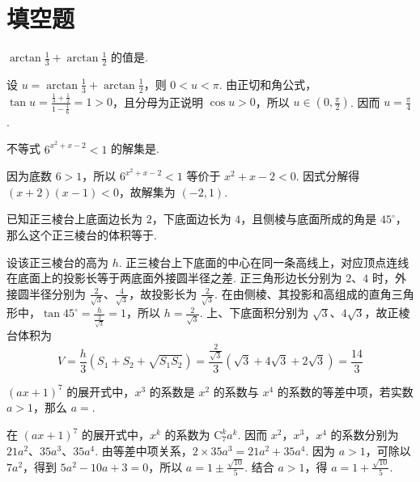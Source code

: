 \section{填空题}

\begin{problem}
\(\arctan \frac{1}{3}+\arctan \frac{1}{2}\) 的值是\fillinblank{}.


\begin{solution}
设 \(u=\arctan\frac{1}{3}+\arctan\frac{1}{2}\)，则 \(0<u<\pi\). 由正切和角公式，\(\tan u=\frac{\frac13+\frac12}{1-\frac16}=1>0\)，且分母为正说明 \(\cos u>0\)，所以 \(u\in\left(0,\frac{\pi}{2}\right)\). 因而 \(u=\frac{\pi}{4}\).
\end{solution}
\end{problem}

\begin{problem}
不等式 \(6^{x^2+x-2}<1\) 的解集是\fillinblank{}.


\begin{solution}
因为底数 \(6>1\)，所以 \(6^{x^2+x-2}<1\) 等价于 \(x^2+x-2<0\). 因式分解得 \((x+2)(x-1)<0\)，故解集为 \(\left(-2,1\right)\).
\end{solution}
\end{problem}

\begin{problem}
已知正三棱台上底面边长为 \(2\)，下底面边长为 \(4\)，且侧棱与底面所成的角是 \(45^\circ\)，那么这个正三棱台的体积等于\fillinblank{}.


\begin{solution}
设该正三棱台的高为 \(h\). 正三棱台上下底面的中心在同一条高线上，对应顶点连线在底面上的投影长等于两底面外接圆半径之差. 正三角形边长分别为 \(2\)、\(4\) 时，外接圆半径分别为 \(\frac{2}{\sqrt3}\)、\(\frac{4}{\sqrt3}\)，故投影长为 \(\frac{2}{\sqrt3}\). 在由侧棱、其投影和高组成的直角三角形中，\(\tan45^\circ=\frac{h}{\frac{2}{\sqrt3}}=1\)，所以 \(h=\frac{2}{\sqrt3}\). 上、下底面积分别为 \(\sqrt3\)、\(4\sqrt3\)，故正棱台体积为
\[
V=\frac{h}{3}\left(S_1+S_2+\sqrt{S_1S_2}\right)=\frac{\frac{2}{\sqrt3}}{3}\left(\sqrt3+4\sqrt3+2\sqrt3\right)=\frac{14}{3}
\]
\end{solution}
\end{problem}

\begin{problem}
\(\left(ax+1\right)^7\) 的展开式中，\(x^3\) 的系数是 \(x^2\) 的系数与 \(x^4\) 的系数的等差中项，若实数 \(a>1\)，那么 \(a=\)\fillinblank{}.


\begin{solution}
在 \((ax+1)^7\) 的展开式中，\(x^k\) 的系数为 \(\mathrm C_7^k a^k\). 因而 \(x^2\)，\(x^3\)，\(x^4\) 的系数分别为 \(21a^2\)、\(35a^3\)、\(35a^4\). 由等差中项关系，\(2\times35a^3=21a^2+35a^4\). 因为 \(a>1\)，可除以 \(7a^2\)，得到 \(5a^2-10a+3=0\)，所以 \(a=1\pm\frac{\sqrt{10}}{5}\). 结合 \(a>1\)，得 \(a=1+\frac{\sqrt{10}}{5}\).
\end{solution}
\end{problem}


